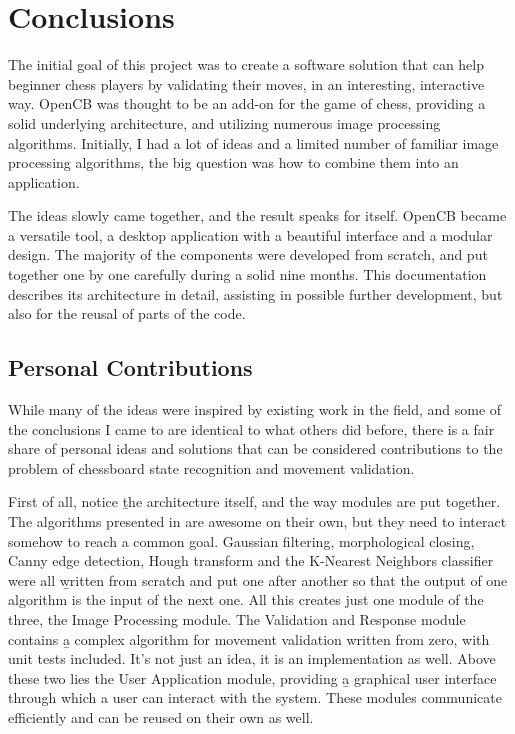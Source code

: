\chapter{Conclusions} \label{conclusions} \pagestyle{fancy}


The initial goal of this project was to create a software solution that can help beginner chess players by validating their moves, in an interesting, interactive way. OpenCB was thought to be an add-on for the game of chess, providing a solid underlying architecture, and utilizing numerous image processing algorithms. Initially, I had a lot of ideas and a limited number of familiar image processing algorithms, the big question was how to combine them into an application.

The ideas slowly came together, and the result speaks for itself. OpenCB became a versatile tool, a desktop application with a beautiful interface and a modular design. The majority of the components were developed from scratch, and put together one by one carefully during a solid nine months. This documentation describes its architecture in detail, assisting in possible further development, but also for the reusal of parts of the code.




\section{Personal Contributions}

While many of the ideas were inspired by existing work in the field, and some of the conclusions I came to are identical to what others did before, there is a fair share of personal ideas and solutions that can be considered contributions to the problem of chessboard state recognition and movement validation.

First of all, notice \b{the architecture} itself, and the way modules are put together. The algorithms presented in  are awesome on their own, but they need to interact somehow to reach a common goal. Gaussian filtering, morphological closing, Canny edge detection, Hough transform and the K-Nearest Neighbors classifier were all \b{written from scratch} and put one after another so that the output of one algorithm is the input of the next one. All this creates just one module of the three, the Image Processing module. The Validation and Response module contains \b{a complex algorithm for movement validation written from zero, with unit tests} included. It's not just an idea, it is an implementation as well. Above these two lies the User Application module, providing \b{a graphical user interface} through which a user can interact with the system. These modules communicate efficiently and can be reused on their own as well.

